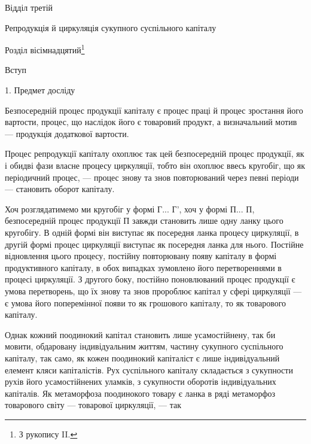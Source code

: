 Відділ третій

Репродукція й циркуляція сукупного
суспільного капіталу

Розділ вісімнадцятий\footnote{
З рукопису II.
}

Вступ

1. Предмет досліду

Безпосередній процес продукції капіталу є процес праці й процес
зростання його вартости, процес, що наслідок його є товаровий продукт,
а визначальний мотив — продукція додаткової вартости.

Процес репродукції капіталу охоплює так цей безпосередній процес
продукції, як і обидві фази власне процесу циркуляції, тобто він охоплює
ввесь кругобіг, що як періодичний процес, — процес знову та знов
повторюваний через певні періоди — становить оборот капіталу.

Хоч розглядатимемо ми кругобіг у формі Г... Г', хоч у формі П... П,
безпосередній процес продукції П завжди становить лише одну ланку
цього кругобігу. В одній формі він виступає як посередня ланка процесу
циркуляції, в другій формі процес циркуляції виступає як посередня
ланка для нього. Постійне відновлення цього процесу, постійну повторювану
появу капіталу в формі продуктивного капіталу, в обох випадках
зумовлено його перетвореннями в процесі циркуляції. З другого боку,
постійно поновлюваний процес продукції є умова перетворень, що їх
знову та знов пророблює капітал у сфері циркуляції — є умова його
поперемінної появи то як грошового капіталу, то як товарового
капіталу.

Однак кожний поодинокий капітал становить лише усамостійнену, так
би мовити, обдаровану індивідуальним життям, частину сукупного суспільного
капіталу, так само, як кожен поодинокий капіталіст є лише індивідуальний
елемент кляси капіталістів. Рух суспільного капіталу складається
з сукупности рухів його усамостійнених уламків, з сукупности оборотів
індивідуальних капіталів. Як метаморфоза поодинокого товару є ланка
в ряді метаморфоз товарового світу — товарової циркуляції, — так
\parbreak{}  %
